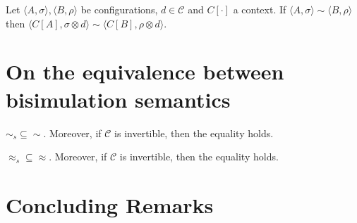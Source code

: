 \documentclass{llncs}
\begin{document}
\begin{proposition}
Let $\langle A,\sigma \rangle, \langle B,\rho \rangle$ be configurations, $d \in \mathcal{C}$
and $C[\cdot]$ a context.
If $\langle A,\sigma \rangle \sim \langle B,\rho \rangle$
then $\langle C[A],\sigma \otimes d\rangle \sim \langle C[B],\rho \otimes d \rangle$.
%
\end{proposition}

\section{On the equivalence between bisimulation semantics}

\begin{theorem}
$\sim_{\mathit{s}} \subseteq \sim$. Moreover, if $\mathcal{C}$ is invertible, then the equality holds.
\end{theorem}

\begin{theorem}
$\approx_{\mathit{s}}  \subseteq \approx$. Moreover, if $\mathcal{C}$ is invertible, then the equality holds.
\end{theorem}


\section{Concluding Remarks}\label{sec:conclusion}


\end{document}
